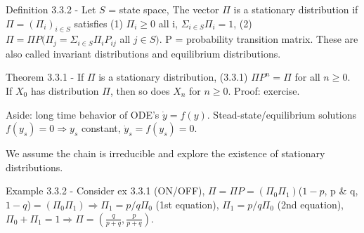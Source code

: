 \documentclass{article}
\begin{document}
Definition 3.3.2 - Let $S$ = state space, The vector $\Pi$ is a stationary distribution if $\Pi = (\Pi_i)_{i \in S}$ satisfies (1) $\Pi_i \ge 0$ all i, $\Sigma_{i \in S} \Pi_i = 1$, (2) $\Pi = \Pi P(\Pi_j = \Sigma_{i \in S} \Pi_i P_{ij}$ all $j \in S)$. P = probability transition matrix. These are also called invariant distributions and equilibrium distributions.

Theorem 3.3.1 - If $\Pi$ is a stationary distribution, (3.3.1) $\Pi P^n = \Pi$ for all $n \ge 0$. If $X_0$ has distribution $\Pi$, then so does $X_n$ for $n \ge 0$. Proof: exercise.

Aside: long time behavior of ODE's $\dot y = f(y)$. Stead-state/equilibrium solutions $f(y_s) = 0 \Rightarrow y_s $ constant, $\dot y_s = f(y_s) = 0$.

We assume the chain is irreducible and explore the existence of stationary distributions.

Example 3.3.2 - Consider ex 3.3.1 (ON/OFF), $\Pi = \Pi P = (\Pi_0 \Pi_1) $($1-p$, p \& q, $1-q$)$ = (\Pi_0 \Pi_1) \Rightarrow \Pi_1 = p/q \Pi_0$ (1st equation), $\Pi_1 = p/q \Pi_0$ (2nd equation), $\Pi_0 + \Pi_1 = 1 \Rightarrow \Pi = (\frac{q}{p+q}, \frac{p}{p+q})$.
\end{document}
